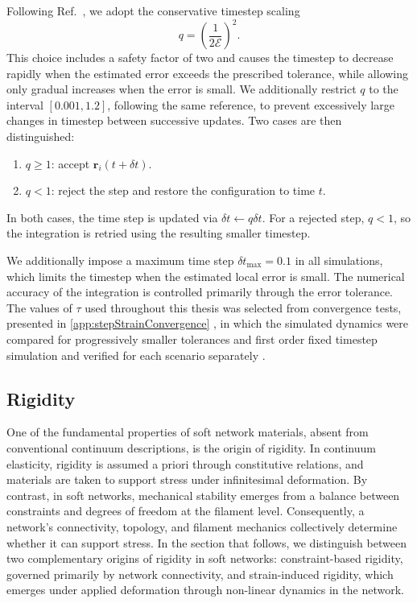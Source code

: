 Following Ref.~\cite{sammullerAdaptiveBrownianDynamics2021}, we adopt the conservative timestep scaling
\begin{equation*}
    q = \left( \frac{1}{2\mathcal{E}} \right)^2.
\end{equation*}
This choice includes a safety factor of two and causes the timestep to decrease rapidly when the estimated error exceeds the prescribed tolerance, while allowing only gradual increases when the error is small. We additionally restrict $q$ to the interval $[0.001, 1.2]$, following the same reference, to prevent excessively large changes in timestep between successive updates. Two cases are then distinguished:
\begin{enumerate}
    \item $q \geq 1$: accept $\bm{r}_i(t+\delta t)$.
    \item $q < 1$: reject the step and restore the configuration to time $t$.
\end{enumerate}
In both cases, the time step is updated via $\delta t \gets q \delta t$. For a rejected step, $q < 1$, so the integration is retried using the resulting smaller timestep.

We additionally impose a maximum time step $\delta t_{\max} = 0.1$ in all simulations, which limits the timestep when the estimated local error is small. The numerical accuracy of the integration is controlled primarily through the error tolerance. The values of $\tau$ used throughout this thesis was selected from convergence tests, presented in \cref{app:stepStrainConvergence} , in which the simulated dynamics were compared for progressively smaller tolerances and first order fixed timestep simulation and verified for each scenario separately .  

\subsection{Rigidity} \label{sec:Rigidity}

One of the fundamental properties of soft network materials, absent from conventional continuum descriptions, is the origin of rigidity. In continuum elasticity, rigidity is assumed a priori through constitutive relations, and materials are taken to support stress under infinitesimal deformation. By contrast, in soft networks, mechanical stability emerges from a balance between constraints and degrees of freedom at the filament level. Consequently, a network's connectivity, topology, and filament mechanics collectively determine whether it can support stress. In the section that follows, we distinguish between two complementary origins of rigidity in soft networks: constraint-based rigidity, governed primarily by network connectivity, and strain-induced rigidity, which emerges under applied deformation through non-linear dynamics in the network.

